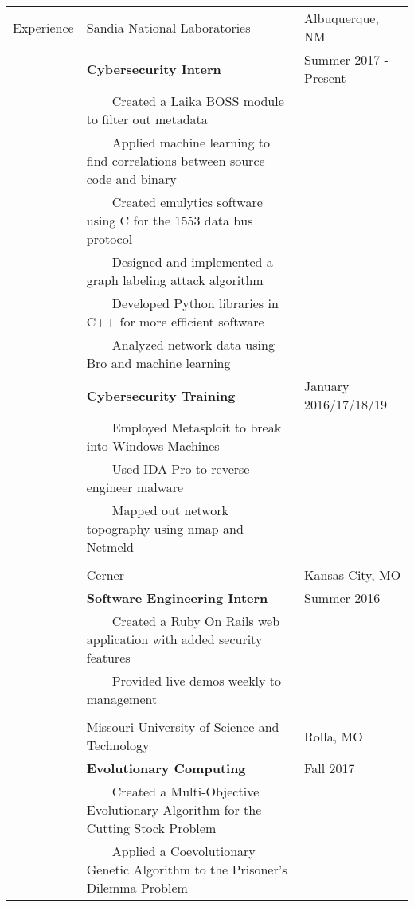 \documentclass[10.5pt, arial]{article}
\newcommand{\tabitem}{~~\llap{\textbullet}~~}
\begin{document}
\begin{tabular}{p{1.5cm} p{13.2cm} l}
Experience  & Sandia National Laboratories	& Albuquerque, NM 		\\
			& \textbf{Cybersecurity Intern}										& Summer 2017 - Present 		\\
			& \tabitem Created a Laika BOSS module to filter out metadata		&						\\
			& \tabitem Applied machine learning to find correlations between source code and binary & 	\\
			& \tabitem Created emulytics software using C for the 1553 data bus protocol 	&			\\
            & \tabitem Designed and implemented a graph labeling attack algorithm 	&     				\\
            & \tabitem Developed Python libraries in C++ for more efficient software 	& 				\\
            & \tabitem Analyzed network data using Bro and machine learning 			& 				\\
            & \textbf{Cybersecurity Training} 									& January 2016/17/18/19 			\\
			& \tabitem Employed Metasploit to break into Windows Machines		&	 					\\
			& \tabitem Used IDA Pro to reverse engineer malware 				& 						\\
			& \tabitem Mapped out network topography using nmap and Netmeld		&						\\ \\

			& Cerner 															& Kansas City, MO 		\\
			& \textbf{Software Engineering Intern} 								& Summer 2016			\\
			& \tabitem Created a Ruby On Rails web application with added security features					& 						\\
			& \tabitem Provided live demos weekly to management 				& 						\\ \\

			& Missouri University of Science and Technology						& Rolla, MO 			\\
			& \textbf{Evolutionary Computing} 									& Fall 2017 			\\
			& \tabitem Created a Multi-Objective Evolutionary Algorithm for the Cutting Stock Problem	& \\
			& \tabitem Applied a Coevolutionary Genetic Algorithm to the Prisoner's Dilemma Problem 	& 		\\


\end{tabular}
\end{document}
